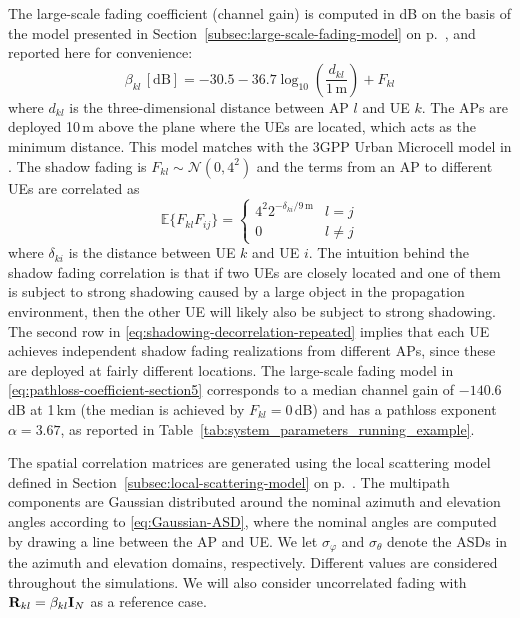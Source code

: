 The large-scale fading coefficient (channel gain) is computed in dB on the basis of the model presented in Section~\ref{subsec:large-scale-fading-model} on p.~\pageref{subsec:large-scale-fading-model}, and reported here for convenience:
\begin{equation}\label{eq:pathloss-coefficient-section5}
\beta_{kl} \,  [\textrm{dB}] = -30.5 - 36.7 \log_{10}\left( \frac{d_{kl}}{1\,\textrm{m}} \right)  + F_{kl}
\end{equation}
where $d_{kl}$ is the three-dimensional distance between \gls{AP} $l$ and \gls{UE} $k$. The APs are deployed 10\,m above the plane where the UEs are located, which acts as the minimum distance. This model matches with the 3GPP Urban Microcell model in \cite[Table~B.1.2.1-1]{LTE2017a}. The shadow fading is $F_{kl} \sim \mathcal{N}(0,4^2)$ and the terms from an AP to different UEs are correlated as \cite[Table B.1.2.2.1-4]{LTE2017a}
\begin{equation} \label{eq:shadowing-decorrelation-repeated}
\mathbb{E} \{ F_{kl} F_{ij} \} = 
\begin{cases}
4^2 2^{-\delta_{ki}/9\,\textrm{m}} & l = j \\
0 & l \neq j
\end{cases}
\end{equation}
where $\delta_{ki}$ is the distance between UE $k$ and UE $i$. The intuition behind the shadow fading correlation is that if two UEs are closely located and one of them is subject to strong shadowing caused by a large object in the propagation environment, then the other UE will likely also be subject to strong shadowing. The second row in \eqref{eq:shadowing-decorrelation-repeated} implies that each UE achieves independent shadow fading realizations from different APs, since these are deployed at fairly different locations. 
The large-scale fading model in \eqref{eq:pathloss-coefficient-section5} corresponds to a median channel gain of $-140.6$\,dB at 1\,km (the median is achieved by $F_{kl}=0$\,dB) and has a pathloss exponent $\alpha=3.67$, as reported in Table~\ref{tab:system_parameters_running_example}.


The spatial correlation matrices are generated using the local scattering model defined in Section~\ref{subsec:local-scattering-model} on p.~\pageref{subsec:local-scattering-model}. The multipath components are Gaussian distributed  around the nominal azimuth and elevation angles according to \eqref{eq:Gaussian-ASD}, where the nominal angles are computed by drawing a line between the AP and UE. We let $\sigma_{\varphi}$ and $\sigma_{\theta}$ denote the ASDs in the azimuth and elevation domains, respectively. Different values are considered throughout the simulations. We will also consider uncorrelated fading with  $\mathbf{R}_{kl} = \beta_{kl}  \mathbf{I}_{N}$ as a reference case. 

